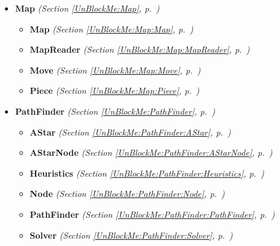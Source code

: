 \begin{itemize}
\setlength{\parskip}{0ex}
\item \textbf{Map}
  \textit{(Section \ref{UnBlockMe:Map}, p.~\pageref{UnBlockMe:Map})}

  \begin{itemize}
\setlength{\parskip}{0ex}
    \item \textbf{Map}
  \textit{(Section \ref{UnBlockMe:Map:Map}, p.~\pageref{UnBlockMe:Map:Map})}

    \item \textbf{MapReader}
  \textit{(Section \ref{UnBlockMe:Map:MapReader}, p.~\pageref{UnBlockMe:Map:MapReader})}

    \item \textbf{Move}
  \textit{(Section \ref{UnBlockMe:Map:Move}, p.~\pageref{UnBlockMe:Map:Move})}

    \item \textbf{Piece}
  \textit{(Section \ref{UnBlockMe:Map:Piece}, p.~\pageref{UnBlockMe:Map:Piece})}

  \end{itemize}
\item \textbf{PathFinder}
  \textit{(Section \ref{UnBlockMe:PathFinder}, p.~\pageref{UnBlockMe:PathFinder})}

  \begin{itemize}
\setlength{\parskip}{0ex}
    \item \textbf{AStar}
  \textit{(Section \ref{UnBlockMe:PathFinder:AStar}, p.~\pageref{UnBlockMe:PathFinder:AStar})}

    \item \textbf{AStarNode}
  \textit{(Section \ref{UnBlockMe:PathFinder:AStarNode}, p.~\pageref{UnBlockMe:PathFinder:AStarNode})}

    \item \textbf{Heuristics}
  \textit{(Section \ref{UnBlockMe:PathFinder:Heuristics}, p.~\pageref{UnBlockMe:PathFinder:Heuristics})}

    \item \textbf{Node}
  \textit{(Section \ref{UnBlockMe:PathFinder:Node}, p.~\pageref{UnBlockMe:PathFinder:Node})}

    \item \textbf{PathFinder}
  \textit{(Section \ref{UnBlockMe:PathFinder:PathFinder}, p.~\pageref{UnBlockMe:PathFinder:PathFinder})}

    \item \textbf{Solver}
  \textit{(Section \ref{UnBlockMe:PathFinder:Solver}, p.~\pageref{UnBlockMe:PathFinder:Solver})}


\end{itemize}
\end{itemize}
